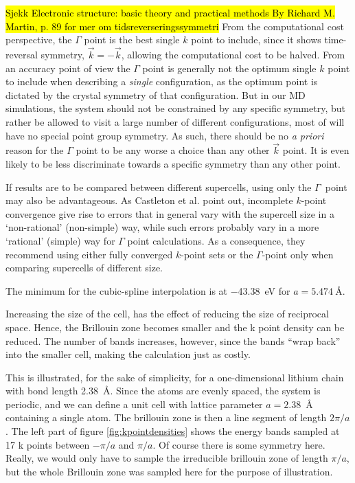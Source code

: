 \documentclass[11pt,bibliography=totoc,index=totoc]{scrbook}   %
\newcommand{\comment}[1]{\hl{#1}}
\begin{document}
\comment{Sjekk 
Electronic structure: basic theory and practical methods By Richard M. Martin, p. 89 for mer om tidsreverseringssymmetri}
From the computational cost perspective, the $\Gamma$ point is the best single $k$ point to include, since it shows time-reversal symmetry, 
$\vec{k}=-\vec{k}$, allowing the computational cost to be halved. 
From an accuracy point of view the $\Gamma$ point is generally not the optimum single $k$ point to include when describing a \emph{single} configuration, as the optimum point is dictated by the crystal symmetry of that configuration\cite{Baldereschi:1973}. 
But in our MD simulations, the system should not be constrained by any specific symmetry, but rather be allowed to visit a large number of different configurations, most of will have no special point group symmetry. 
As such, there should be no \textit{a priori} reason for the $\Gamma$ point to be any worse a choice than any other $\vec{k}$ point. 
It is even likely to be less discriminate towards a specific symmetry than any other point.

If results are to be compared between different supercells, using only the $\Gamma$~point may also be advantageous.
As Castleton et al. point out\cite{Castleton:2009}, incomplete $k$-point convergence give rise to errors that in general vary with the supercell size in a `non-rational' (non-simple) way, while such errors probably vary in a more `rational' (simple) way for $\Gamma$ point calculations. 
As a consequence, they recommend using either fully converged $k$-point sets or the $\Gamma$-point only when comparing supercells of different size.


     The minimum for the cubic-spline interpolation is at
     \SI{-43.38}{\electronvolt} for $a=\SI{5.474}{\angstrom}$.
\cite{Haas:2010}

Increasing the size of the cell, has the effect of reducing the size of reciprocal space. 
Hence, the Brillouin zone becomes smaller and the k point density can be reduced. 
The number of bands increases, however, since the bands ``wrap back'' into the smaller cell,
making the calculation just as costly.

This is illustrated, for the sake of simplicity, for a one-dimensional 
lithium chain with bond length 2.38~Å. Since the atoms are evenly spaced,
the system is periodic, and we can define a unit cell with lattice parameter 
$a=2.38$~Å containing a single atom. 
The brillouin zone is then a line segment of length $2\pi/a$. 
The left part of figure \ref{fig:kpointdensities} shows the energy bands sampled at 17 k points between $-\pi/a$ and $\pi/a$. 
Of course there is some symmetry here. Really, we would only have to sample the irreducible brillouin zone of length $\pi/a$, 
but the whole Brillouin zone was sampled here for the purpose of illustration.
\end{document}

